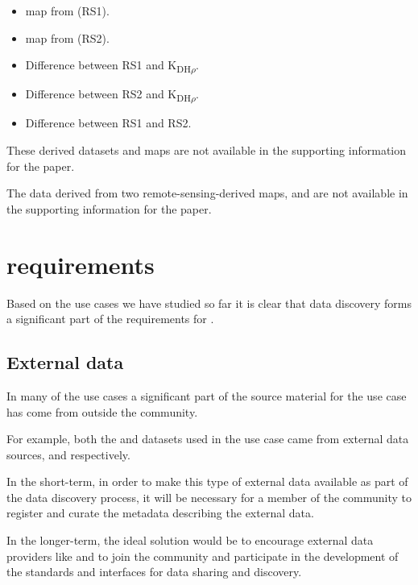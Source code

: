 \documentclass{article}
\begin{document}
\begin{itemize}
    \item \cite{term-agb} map from \cite{saatchi-2011} (RS1).
    \item \cite{term-agb} map from \cite{baccini-2012} (RS2).
    \item Difference between RS1 and K\textsubscript{DH$\rho$}.
    \item Difference between RS2 and K\textsubscript{DH$\rho$}.
    \item Difference between RS1 and RS2.
\end{itemize}

These derived datasets and maps are not available in the supporting
information for the paper.

The \cite{term-agb} data derived from two remote-sensing-derived maps,
\cite{saatchi-2011} and \cite{baccini-2012} are not available in the
supporting information for the paper.

\section{\cite{trop} requirements}

Based on the \cite{trop} use cases we have studied so far it is clear that
data discovery forms a significant part of the requirements for \cite{trop}.

\subsection{External data}

In many of the use cases a significant part of the source material for
the use case has come from outside the \cite{trop} community.

For example, both the \cite{saatchi-2011} and \cite{baccini-2012} datasets
used in the \cite{mitchard-2014} use case came from external data sources,
 and  respectively.

In the short-term, in order to make this type of external data available
as part of the \cite{trop} data discovery process, it will be necessary
for a member of the \cite{trop} community to register and curate the
\cite{trop} metadata describing the external data.

In the longer-term, the ideal solution would be to encourage external data
providers like  and  to join
the \cite{trop} community and participate in the development of the standards
and \cite{web-service} interfaces for data sharing and discovery.
\end{document}
